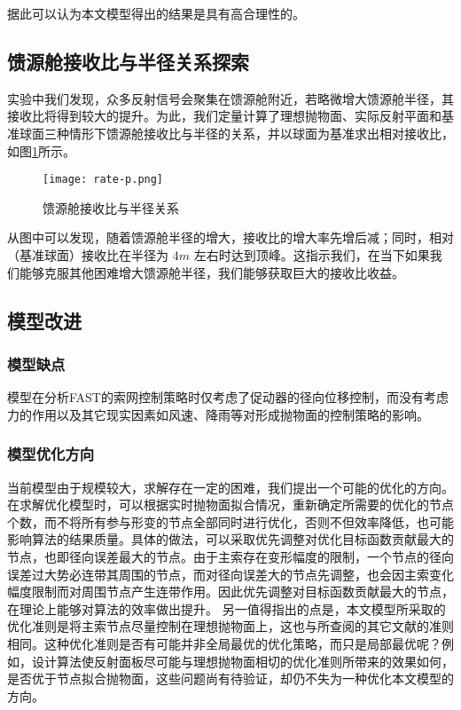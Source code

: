 \documentclass[withoutpreface,bwprint,fontset=macnew]{cumcmthesis} %
\begin{document}
		
		据此可以认为本文模型得出的结果是具有高合理性的。
		
		
	\subsection{馈源舱接收比与半径关系探索}
	
		实验中我们发现，众多反射信号会聚集在馈源舱附近，若略微增大馈源舱半径，其接收比将得到较大的提升。为此，我们定量计算了理想抛物面、实际反射平面和基准球面三种情形下馈源舱接收比与半径的关系，并以球面为基准求出相对接收比，如图\ref{fig:rate-p}所示。
		
		\begin{figure}[!h]
			\centering
			\texttt{[image: rate-p.png]} %
			\caption{馈源舱接收比与半径关系}
			\label{fig:rate-p}
		\end{figure}
	
		从图中可以发现，随着馈源舱半径的增大，接收比的增大率先增后减；同时，相对（基准球面）接收比在半径为 $4m$ 左右时达到顶峰。这指示我们，在当下如果我们能够克服其他困难增大馈源舱半径，我们能够获取巨大的接收比收益。

	
	\subsection{模型改进}
	\subsubsection {模型缺点}
		模型在分析FAST的索网控制策略时仅考虑了促动器的径向位移控制，而没有考虑力的作用以及其它现实因素如风速、降雨等对形成抛物面的控制策略的影响。
	\subsubsection {模型优化方向}
		当前模型由于规模较大，求解存在一定的困难，我们提出一个可能的优化的方向。在求解优化模型时，可以根据实时抛物面拟合情况，重新确定所需要的优化的节点个数，而不将所有参与形变的节点全部同时进行优化，否则不但效率降低，也可能影响算法的结果质量。具体的做法，可以采取优先调整对优化目标函数贡献最大的节点，也即径向误差最大的节点。由于主索存在变形幅度的限制，一个节点的径向误差过大势必连带其周围的节点，而对径向误差大的节点先调整，也会因主索变化幅度限制而对周围节点产生连带作用。因此优先调整对目标函数贡献最大的节点，在理论上能够对算法的效率做出提升。
		另一值得指出的点是，本文模型所采取的优化准则是将主索节点尽量控制在理想抛物面上，这也与所查阅的其它文献的准则相同。这种优化准则是否有可能并非全局最优的优化策略，而只是局部最优呢？例如，设计算法使反射面板尽可能与理想抛物面相切的优化准则所带来的效果如何，是否优于节点拟合抛物面，这些问题尚有待验证，却仍不失为一种优化本文模型的方向。
\end{document}
